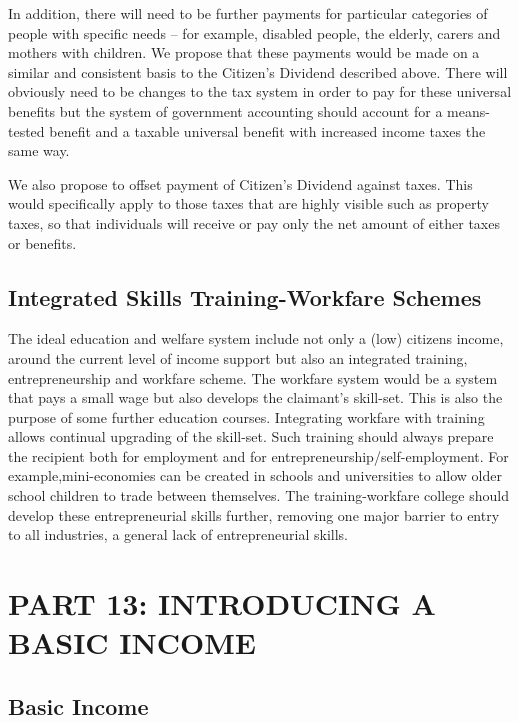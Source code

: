 \documentclass[]{tufte-handout}
\begin{document}
In addition, there will need to be further payments for particular
categories of people with specific needs -- for example, disabled
people, the elderly, carers and mothers with children. We propose that
these payments would be made on a similar and consistent basis to the
Citizen's Dividend described above. There will obviously need to be
changes to the tax system in order to pay for these universal benefits
but the system of government accounting should account for a
means-tested benefit and a taxable universal benefit with increased
income taxes the same way.

We also propose to offset payment of Citizen's Dividend against taxes.
This would specifically apply to those taxes that are highly visible
such as property taxes, so that individuals will receive or pay only the
net amount of either taxes or benefits.

\hypertarget{integrated-skills-training-workfare-schemes}{%
\subsection{Integrated Skills Training-Workfare
Schemes}\label{integrated-skills-training-workfare-schemes}}

The ideal education and welfare system include not only a (low) citizens
income, around the current level of income support but also an
integrated training, entrepreneurship and workfare scheme. The workfare
system would be a system that pays a small wage but also develops the
claimant's skill-set. This is also the purpose of some further education
courses. Integrating workfare with training allows continual upgrading
of the skill-set. Such training should always prepare the recipient both
for employment and for entrepreneurship/self-employment. For
example,mini-economies can be created in schools and universities to
allow older school children to trade between themselves. The
training-workfare college should develop these entrepreneurial skills
further, removing one major barrier to entry to all industries, a
general lack of entrepreneurial skills.

\hypertarget{part-13-introducing-a-basic-income}{%
\section{PART 13: INTRODUCING A BASIC
INCOME}\label{part-13-introducing-a-basic-income}}

\hypertarget{basic-income}{%
\subsection{Basic Income}\label{basic-income}}
\end{document}
